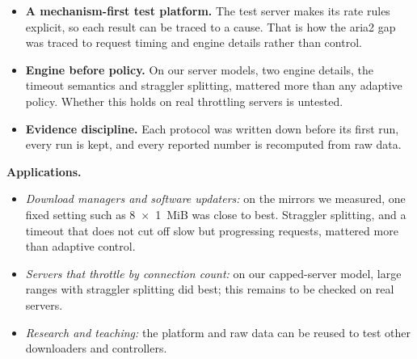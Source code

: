 \begin{itemize}
\item \textbf{A mechanism-first test platform.} The test server makes its rate rules explicit, so each result can be traced to a cause. That is how the aria2 gap was traced to request timing and engine details rather than control.
\item \textbf{Engine before policy.} On our server models, two engine details, the timeout semantics and straggler splitting, mattered more than any adaptive policy. Whether this holds on real throttling servers is untested.
\item \textbf{Evidence discipline.} Each protocol was written down before its first run, every run is kept, and every reported number is recomputed from raw data.
\end{itemize}

\textbf{Applications.}
\begin{itemize}
\item \emph{Download managers and software updaters:} on the mirrors we measured, one fixed setting such as 8~$\times$~1~MiB was close to best. Straggler splitting, and a timeout that does not cut off slow but progressing requests, mattered more than adaptive control.
\item \emph{Servers that throttle by connection count:} on our capped-server model, large ranges with straggler splitting did best; this remains to be checked on real servers.
\item \emph{Research and teaching:} the platform and raw data can be reused to test other downloaders and controllers.
\end{itemize}

